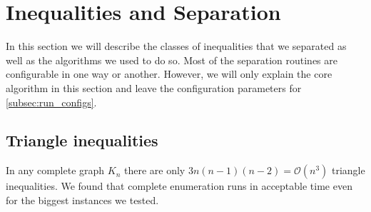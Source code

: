 \section{Inequalities and Separation}\label{sec:separation}
In this section we will describe the classes of inequalities that we separated as well as the algorithms we used to do so.
Most of the separation routines are configurable in one way or another.
However, we will only explain the core algorithm in this section and leave the configuration parameters for \cref{subsec:run_configs}.

\subsection{Triangle inequalities}\label{subsec:triangle_separator}
In any complete graph $K_{n}$ there are only $3n(n-1)(n-2) = \mathcal{O}(n^{3})$ triangle inequalities.
We found that complete enumeration runs in acceptable time even for the biggest instances we tested.

